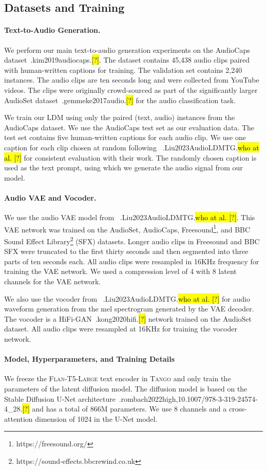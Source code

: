 \documentclass{article}
\newcommand{\model}{\textsc{Tango}}
\let\realcite\cite
\renewcommand{\cite}[1]{\ifx.#1.\hl{[?]}\else\realcite{#1}\fi}
\let\realcitet\citet
\renewcommand{\citet}[1]{\ifx.#1.\hl{who at al. [?]}\else\realcitet{#1}\fi}
\begin{document}
\subsection{Datasets and Training}
\paragraph{Text-to-Audio Generation.}
We perform our main text-to-audio generation experiments on the AudioCaps dataset~\cite{kim2019audiocaps}. The dataset contains 45,438 audio clips paired with human-written captions for training. The validation set contains 2,240 instances. The audio clips are ten seconds long and were collected from YouTube videos. The clips were originally crowd-sourced as part of the significantly larger AudioSet dataset~\cite{gemmeke2017audio} for the audio classification task.

We train our LDM using only the paired (text, audio) instances from the AudioCaps dataset. We use the AudioCaps test set as our evaluation data. The test set contains five human-written captions for each audio clip. We use one caption for each clip chosen at random following ~\citet{Liu2023AudioLDMTG} for consistent evaluation with their work. The randomly chosen caption is used as the text prompt, using which we generate the audio signal from our model.

\paragraph{Audio VAE and Vocoder.}
We use the audio VAE model from ~\citet{Liu2023AudioLDMTG}. This VAE network was trained on the AudioSet, AudioCaps, Freesound\footnote{https://freesound.org/}, and BBC Sound Effect Library\footnote{https://sound-effects.bbcrewind.co.uk} (SFX) datasets. Longer audio clips in Freesound and BBC SFX were truncated to the first thirty seconds and then segmented into three parts of ten seconds each. All audio clips were resampled in 16KHz frequency for training the VAE network. We used a compression level of 4 with 8 latent channels for the VAE network. 

We also use the vocoder from ~\citet{Liu2023AudioLDMTG} for audio waveform generation from the mel spectrogram generated by the VAE decoder. The vocoder is a HiFi-GAN~\cite{kong2020hifi} network trained on the AudioSet dataset. All audio clips were resampled at 16KHz for training the vocoder network.

\paragraph{Model, Hyperparameters, and Training Details}
We freeze the \textsc{Flan-T5-Large} text encoder in \model{} and only train the parameters of the latent diffusion model. The diffusion model is based on the Stable Diffusion U-Net architecture~\cite{rombach2022high,10.1007/978-3-319-24574-4_28} and has a total of 866M parameters. We use 8 channels and a cross-attention dimension of 1024 in the U-Net model.
\end{document}
